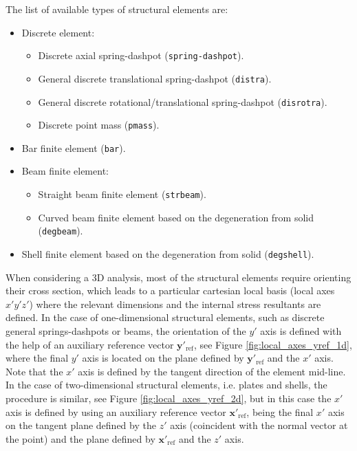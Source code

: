 \documentclass[a4paper,fleqn]{book}
\begin{document}
The list of available types of structural elements are:
\begin{itemize}
  \item Discrete element:
  \begin{itemize}
    \item Discrete axial spring-dashpot (\texttt{spring-dashpot}).  
    \item General discrete translational spring-dashpot (\texttt{distra}).
    \item General discrete rotational/translational spring-dashpot (\texttt{disrotra}).
    \item Discrete point mass (\texttt{pmass}).
  \end{itemize}
  \item Bar finite element (\texttt{bar}).
  \item Beam finite element:
  \begin{itemize}
    \item Straight beam finite element (\texttt{strbeam}).
    \item Curved beam finite element based on the degeneration from solid (\texttt{degbeam}).
  \end{itemize}
  \item Shell finite element based on the degeneration from solid (\texttt{degshell}).
\end{itemize}
When considering a 3D analysis, most of the structural elements require orienting their cross section, which leads to a particular cartesian local basis (local axes $x'y'z'$) where the relevant dimensions and the internal stress resultants are defined. In the case of one-dimensional structural elements, such as discrete general springs-dashpots or beams, the orientation of the $y'$ axis is defined with the help of an auxiliary reference vector $\mathbf{y}'_\mathrm{ref}$, see Figure \ref{fig:local_axes_yref_1d}, where the final $y'$ axis is located on the plane defined by $\mathbf{y}'_\mathrm{ref}$ and the $x'$ axis. Note that the $x'$ axis is defined by the tangent direction of the element mid-line. In the case of two-dimensional structural elements, i.e. plates and shells, the procedure is similar, see Figure \ref{fig:local_axes_yref_2d}, but in this case the $x'$ axis is defined by using an auxiliary reference vector $\mathbf{x}'_\mathrm{ref}$, being the final $x'$ axis on the tangent plane defined by the $z'$ axis (coincident with the normal vector at the point) and the plane defined by $\mathbf{x}'_\mathrm{ref}$ and the $z'$ axis.
\end{document}
